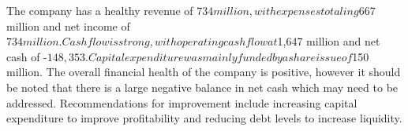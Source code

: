 

The company has a healthy revenue of $734 million, with expenses totaling $667 million and net income of $734 million. Cash flow is strong, with operating cash flow at $1,647 million and net cash of -$148,353. Capital expenditure was mainly funded by a share issue of $150 million. The overall financial health of the company is positive, however it should be noted that there is a large negative balance in net cash which may need to be addressed. Recommendations for improvement include increasing capital expenditure to improve profitability and reducing debt levels to increase liquidity.